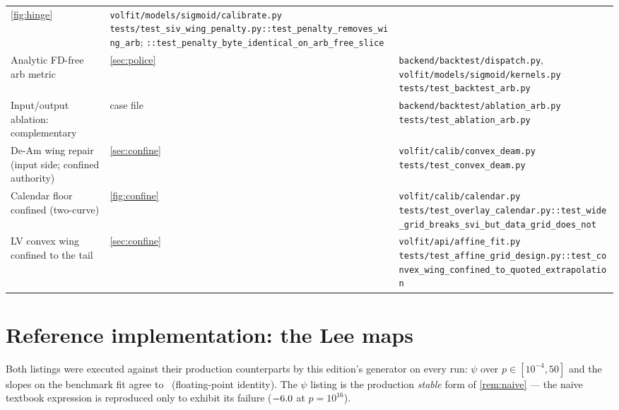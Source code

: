 \documentclass[11pt]{article}
\begin{document}
\begin{longtable}{@{}p{}p{}p{}@{}}
\cref{fig:hinge} &
\nolinkurl{volfit/models/sigmoid/calibrate.py}\newline
\nolinkurl{tests/test_siv_wing_penalty.py::test_penalty_removes_wing_arb};
\nolinkurl{::test_penalty_byte_identical_on_arb_free_slice}\\
\addlinespace
Analytic FD-free arb metric &
\cref{sec:police} &
\nolinkurl{backend/backtest/dispatch.py},
\nolinkurl{volfit/models/sigmoid/kernels.py}\newline
\nolinkurl{tests/test_backtest_arb.py}\\
\addlinespace
Input/output ablation: complementary &
case file &
\nolinkurl{backend/backtest/ablation_arb.py}\newline
\nolinkurl{tests/test_ablation_arb.py}\\
\addlinespace
De-Am wing repair (input side; confined authority) &
\cref{sec:confine} &
\nolinkurl{volfit/calib/convex_deam.py}\newline
\nolinkurl{tests/test_convex_deam.py}\\
\addlinespace
Calendar floor confined (two-curve) &
\cref{fig:confine} &
\nolinkurl{volfit/calib/calendar.py}\newline
\nolinkurl{tests/test_overlay_calendar.py::test_wide_grid_breaks_svi_but_data_grid_does_not}\\
\addlinespace
LV convex wing confined to the tail &
\cref{sec:confine} &
\nolinkurl{volfit/api/affine_fit.py}\newline
\nolinkurl{tests/test_affine_grid_design.py::test_convex_wing_confined_to_quoted_extrapolation}\\
\bottomrule
\end{longtable}
\endgroup

\section{Reference implementation: the Lee maps}
\label{app:ref}

Both listings were executed against their production counterparts by
this edition's generator on every run: $\psi$ over
$p\in[10^{-4},50]$ and the slopes on the benchmark fit agree to
\wlqrefagree\ (floating-point identity).  The $\psi$ listing is the
production \emph{stable} form of \cref{rem:naive} --- the naive
textbook expression is reproduced only to exhibit its failure
($-6.0$ at $p=10^{16}$).
\end{document}
